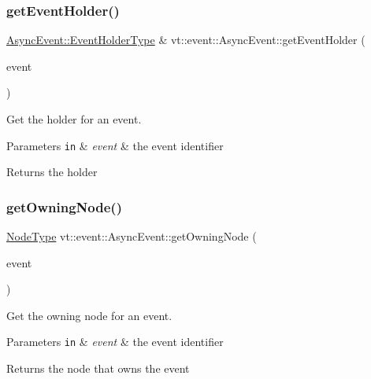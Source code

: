 \subsubsection{\texorpdfstring{get\+Event\+Holder()}{getEventHolder()}}
{\footnotesize\ttfamily \hyperlink{structvt_1_1event_1_1_async_event_a6b529d829ccb5b12c50c2b1978c41a86}{Async\+Event\+::\+Event\+Holder\+Type} \& vt\+::event\+::\+Async\+Event\+::get\+Event\+Holder (\begin{DoxyParamCaption}\item[{\hyperlink{namespacevt_a009267401def7ae8bf201892222d060f}{Event\+Type} const \&}]{event }\end{DoxyParamCaption})}



Get the holder for an event. 


\begin{DoxyParams}[1]{Parameters}
\mbox{\tt in}  & {\em event} & the event identifier\\
\hline
\end{DoxyParams}
\begin{DoxyReturn}{Returns}
the holder 
\end{DoxyReturn}
\mbox{\label{structvt_1_1event_1_1_async_event_a288c3db66bf12de8dc65733b184870c0}} 
\subsubsection{\texorpdfstring{get\+Owning\+Node()}{getOwningNode()}}
{\footnotesize\ttfamily \hyperlink{namespacevt_a866da9d0efc19c0a1ce79e9e492f47e2}{Node\+Type} vt\+::event\+::\+Async\+Event\+::get\+Owning\+Node (\begin{DoxyParamCaption}\item[{\hyperlink{namespacevt_a009267401def7ae8bf201892222d060f}{Event\+Type} const \&}]{event }\end{DoxyParamCaption})}



Get the owning node for an event. 


\begin{DoxyParams}[1]{Parameters}
\mbox{\tt in}  & {\em event} & the event identifier\\
\hline
\end{DoxyParams}
\begin{DoxyReturn}{Returns}
the node that owns the event 
\end{DoxyReturn}
\mbox{\label{structvt_1_1event_1_1_async_event_a8aeeb83c7b467b3d130e522d079e5a7d}} 
